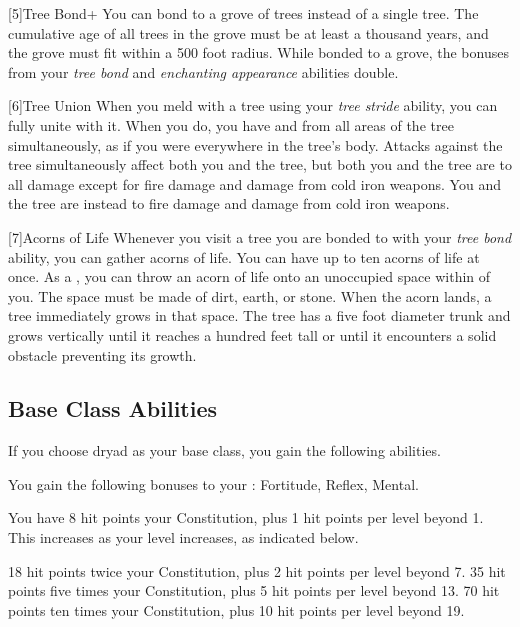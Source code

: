         [5]{Tree Bond+} You can bond to a grove of trees instead of a single tree.
        The cumulative age of all trees in the grove must be at least a thousand years, and the grove must fit within a 500 foot radius.
        While bonded to a grove, the bonuses from your \textit{tree bond} and \textit{enchanting appearance} abilities double.

        [6]{Tree Union} When you meld with a tree using your \textit{tree stride} ability, you can fully unite with it.
        When you do, you have  and  from all areas of the tree simultaneously, as if you were everywhere in the tree's body.
        Attacks against the tree simultaneously affect both you and the tree, but both you and the tree are \impervious to all damage except for fire damage and damage from cold iron weapons.
        You and the tree are instead \vulnerable to fire damage and damage from cold iron weapons.

        [7]{Acorns of Life} Whenever you visit a tree you are bonded to with your \textit{tree bond} ability, you can gather acorns of life.
        You can have up to ten acorns of life at once.
        As a , you can throw an acorn of life onto an unoccupied  space within \medrange of you.
        The space must be made of dirt, earth, or stone.
        When the acorn lands, a tree immediately grows in that space.
        The tree has a five foot diameter trunk and grows vertically until it reaches a hundred feet tall or until it encounters a solid obstacle preventing its growth.

    \subsection{Base Class Abilities}
        If you choose dryad as your base class, you gain the following abilities.

        You gain the following bonuses to your :  Fortitude,  Reflex,  Mental.

            You have 8 hit points \add  your Constitution, plus 1 hit points per level beyond 1.
            This increases as your level increases, as indicated below.
            \begin{itemize}
                 18 hit points \add twice your Constitution, plus 2 hit points per level beyond 7.
                 35 hit points \add five times your Constitution, plus 5 hit points per level beyond 13.
                 70 hit points \add ten times your Constitution, plus 10 hit points per level beyond 19.
            \end{itemize}

